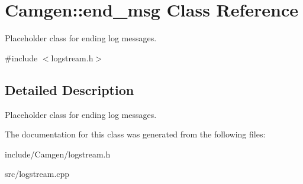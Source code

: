 \hypertarget{a00134}{\section{Camgen\-:\-:end\-\_\-msg Class Reference}
\label{a00134}
}


Placeholder class for ending log messages.  




{\ttfamily \#include $<$logstream.\-h$>$}



\subsection{Detailed Description}
Placeholder class for ending log messages. 

The documentation for this class was generated from the following files\-:\begin{DoxyCompactItemize}
\item 
include/\-Camgen/logstream.\-h\item 
src/logstream.\-cpp\end{DoxyCompactItemize}
